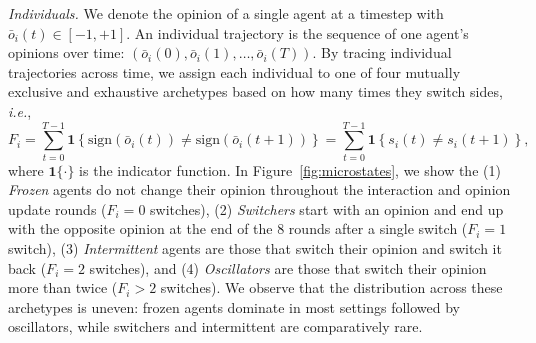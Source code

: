 \textit{Individuals.} We denote the opinion of a single agent at a timestep  with $\bar{o}_i(t) \in [ -1, +1]$. An individual trajectory is the sequence of one agent's opinions over time: 
$
(\bar{o}_i(0),  \bar{o}_i(1), \dots, \bar{o}_i(T))
$. By tracing individual trajectories across time, we assign each individual to one of four mutually exclusive and exhaustive archetypes based on how many times they switch sides, \textit{i.e.}, 
\[
F_i=\sum_{t=0}^{T-1}\mathbf{1}\!\left\{\text{sign}(\bar{o}_i(t))\neq \text{sign}(\bar{o}_i(t+1))\right\}=\sum_{t=0}^{T-1}\mathbf{1}\!\left\{s_i(t)\neq s_i(t+1)\right\},\]
where \(\mathbf{1}\{\cdot\}\) is the indicator function. In Figure~\ref{fig:microstates}, we show the (1) \emph{Frozen} agents do not change their opinion throughout the interaction and opinion update rounds ($F_i=0$ switches), (2) \emph{Switchers} start with an opinion and end up with the opposite opinion at the end of the 8 rounds after a single switch ($F_i=1$ switch), (3) \emph{Intermittent} agents are those that switch their opinion and switch it back ($F_i=2$ switches), and (4) \emph{Oscillators} are those that switch their opinion more than twice ($F_i>2$ switches). We observe that the distribution across these archetypes is uneven: frozen agents dominate in most settings followed by oscillators, while switchers and intermittent are comparatively rare.

